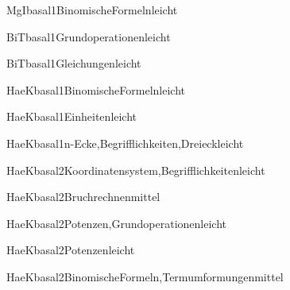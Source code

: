 \documentclass[12pt]{article}
\begin{document}
\begin{Add}{MgI}{basal1}{BinomischeFormeln}{leicht}
\end{Add}

\begin{Add}{BiT}{basal1}{Grundoperationen}{leicht}
\end{Add}

\begin{Add}{BiT}{basal1}{Gleichungen}{leicht}
      
\end{Add}

\begin{Add}{HaeK}{basal1}{BinomischeFormeln}{leicht}
\end{Add}

\begin{Add}{HaeK}{basal1}{Einheiten}{leicht}
\end{Add}

\begin{Add}{HaeK}{basal1}{n-Ecke,Begrifflichkeiten,Dreieck}{leicht}
\end{Add}

\begin{Add}{HaeK}{basal2}{Koordinatensystem,Begrifflichkeiten}{leicht}
\end{Add}

\begin{Add}{HaeK}{basal2}{Bruchrechnen}{mittel}
\end{Add}

\begin{Add}{HaeK}{basal2}{Potenzen,Grundoperationen}{leicht}
\end{Add}

\begin{Add}{HaeK}{basal2}{Potenzen}{leicht}
\end{Add}

\begin{Add}{HaeK}{basal2}{BinomischeFormeln,Termumformungen}{mittel}
\end{Add}
\end{document}
